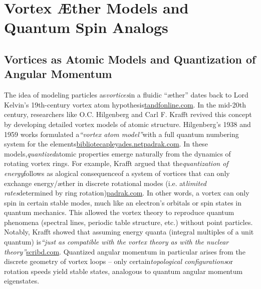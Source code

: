 \chapter*{Vortex Æther Models and Quantum Spin Analogs}
\section*{Vortices as Atomic Models and Quantization of Angular Momentum}
The idea of modeling particles as\textit{vortices}in a fluidic “æther” dates back to Lord Kelvin’s 19th-century vortex atom hypothesis\href{https://www.tandfonline.com/doi/full/10.1080/23746149.2020.1843535#:~:text=Full%20article%3A%20Optical%20vortex%20knots,Although}{tandfonline.com}. In the mid-20th century, researchers like O.C. Hilgenberg and Carl F. Krafft revived this concept by developing detailed vortex models of atomic structure. Hilgenberg’s 1938 and 1959 works formulated a\textit{“vortex atom model”}with a full quantum numbering system for the elements\href{https://www.bibliotecapleyades.net/sociopolitica/reichblacksun/chapter13.htm#:~:text=In%201938%20Hilgenberg%20followed%20this,System%20of%20the%20Chemical%20Elements}{bibliotecapleyades.net}\href{https://www.padrak.com/ine/RS_REF9.html#:~:text=Matter,out%20energy%20and%20ether%2Fspace%20at}{padrak.com}. In these models,\textit{quantized}atomic properties emerge naturally from the dynamics of rotating vortex rings. For example, Krafft argued that the\textit{quantization of energy}follows as alogical consequenceof a system of vortices that can only exchange energy/æther in discrete rotational modes (i.e. at\textit{limited rates}determined by ring rotation)\href{https://www.padrak.com/ine/RS_REF9.html#:~:text=Matter,out%20energy%20and%20ether%2Fspace%20at}{padrak.com}. In other words, a vortex can only spin in certain stable modes, much like an electron’s orbitals or spin states in quantum mechanics. This allowed the vortex theory to reproduce quantum phenomena (spectral lines, periodic table structure, etc.) without point particles. Notably, Krafft showed that assuming energy quanta (integral multiples of a unit quantum) is\textit{“just as compatible with the vortex theory as with the nuclear theory”}\href{https://www.scribd.com/document/310197123/Ether-and-Mater-by-Carl-Krafft-pdf#:~:text=only%20assumption%20which%20needs%20to,made%20in%20the%20derivation%20of}{scribd.com}. Quantized angular momentum in particular arises from the discrete geometry of vortex loops – only certain\textit{topological configurations}or rotation speeds yield stable states, analogous to quantum angular momentum eigenstates.

